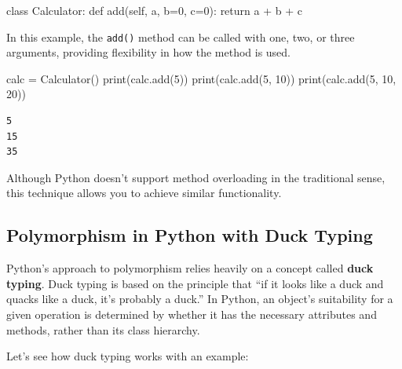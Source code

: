 \documentclass[
  letterpaper,
  DIV=11,
  numbers=noendperiod]{scrreprt}
\newenvironment{Shaded}{\begin{snugshade}}{\end{snugshade}}
\newcommand{\BuiltInTok}[1]{\textcolor[rgb]{0.00,0.23,0.31}{#1}}
\newcommand{\ControlFlowTok}[1]{\textcolor[rgb]{0.00,0.23,0.31}{#1}}
\newcommand{\DecValTok}[1]{\textcolor[rgb]{0.68,0.00,0.00}{#1}}
\newcommand{\KeywordTok}[1]{\textcolor[rgb]{0.00,0.23,0.31}{#1}}
\newcommand{\NormalTok}[1]{\textcolor[rgb]{0.00,0.23,0.31}{#1}}
\newcommand{\OperatorTok}[1]{\textcolor[rgb]{0.37,0.37,0.37}{#1}}
\newcommand{\VariableTok}[1]{\textcolor[rgb]{0.07,0.07,0.07}{#1}}
\begin{document}
\begin{Shaded}
\begin{Highlighting}[]
\KeywordTok{class}\NormalTok{ Calculator:}
    \KeywordTok{def}\NormalTok{ add(}\VariableTok{self}\NormalTok{, a, b}\OperatorTok{=}\DecValTok{0}\NormalTok{, c}\OperatorTok{=}\DecValTok{0}\NormalTok{):}
        \ControlFlowTok{return}\NormalTok{ a }\OperatorTok{+}\NormalTok{ b }\OperatorTok{+}\NormalTok{ c}
\end{Highlighting}
\end{Shaded}

In this example, the \texttt{add()} method can be called with one, two,
or three arguments, providing flexibility in how the method is used.

\begin{Shaded}
\begin{Highlighting}[]
\NormalTok{calc }\OperatorTok{=}\NormalTok{ Calculator()}
\BuiltInTok{print}\NormalTok{(calc.add(}\DecValTok{5}\NormalTok{))      }
\BuiltInTok{print}\NormalTok{(calc.add(}\DecValTok{5}\NormalTok{, }\DecValTok{10}\NormalTok{))  }
\BuiltInTok{print}\NormalTok{(calc.add(}\DecValTok{5}\NormalTok{, }\DecValTok{10}\NormalTok{, }\DecValTok{20}\NormalTok{)) }
\end{Highlighting}
\end{Shaded}

\begin{verbatim}
5
15
35
\end{verbatim}

Although Python doesn't support method overloading in the traditional
sense, this technique allows you to achieve similar functionality.

\hypertarget{polymorphism-in-python-with-duck-typing}{%
\subsection{Polymorphism in Python with Duck
Typing}\label{polymorphism-in-python-with-duck-typing}}

Python's approach to polymorphism relies heavily on a concept called
\textbf{duck typing}. Duck typing is based on the principle that ``if it
looks like a duck and quacks like a duck, it's probably a duck.'' In
Python, an object's suitability for a given operation is determined by
whether it has the necessary attributes and methods, rather than its
class hierarchy.

Let's see how duck typing works with an example:
\end{document}
